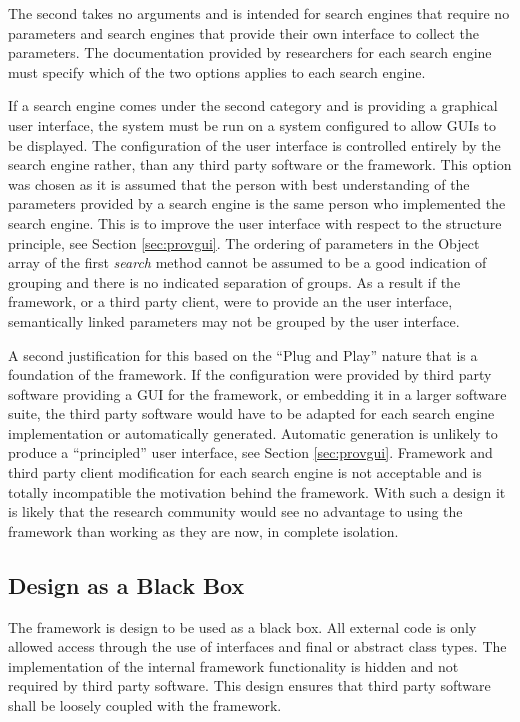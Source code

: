 The second takes no arguments and is intended for search engines that require no parameters and search engines that provide their own interface to collect the parameters.
The documentation provided by researchers for each search engine must specify which of the two options applies to each search engine.

If a search engine comes under the second category and is providing a graphical user interface, the system must be run on a system configured to allow GUIs to be displayed.
The configuration of the user interface is controlled entirely by the search engine rather, than any third party software or the framework.
This option was chosen as it is assumed that the person with best understanding of the parameters provided by a search engine is the same person who implemented the search engine.
This is to improve the user interface with respect to the structure principle, see Section \ref{sec:provgui}.
The ordering of parameters in the Object array of the first \emph{search} method cannot be assumed to be a good indication of grouping and there is no indicated separation of groups.
As a result if the framework, or a third party client, were to provide an the user interface, semantically linked parameters may not be grouped by the user interface.

A second justification for this based on the ``Plug and Play'' nature that is a foundation of the framework.
If the configuration were provided by third party software providing a GUI for the framework, or embedding it in a larger software suite, the third party software would have to be adapted for each search engine implementation or automatically generated.
Automatic generation is unlikely to produce a ``principled'' user interface, see Section \ref{sec:provgui}.
Framework and third party client modification for each search engine is not acceptable and is totally incompatible the motivation behind the framework.
With such a design it is likely that the research community would see no advantage to using the framework than working as they are now, in complete isolation.

\subsection{Design as a Black Box}
\label{sec:thirdpartyblackbox}
The framework is design to be used as a black box.
All external code is only allowed access through the use of interfaces and final or abstract class types.
The implementation of the internal framework functionality is hidden and not required by third party software.
This design ensures that third party software shall be loosely coupled with the framework.

